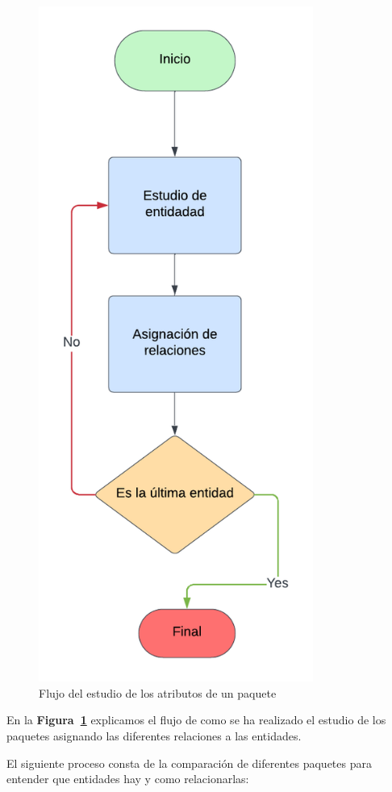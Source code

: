 \documentclass[a4paper, 12pt]{book}
\begin{document}
\begin{figure}
	\centering
	\includegraphics[width=9cm, keepaspectratio]{img/Estudio Atributos.png}
	\caption{Flujo del estudio de los atributos de un paquete}
	\label{fig:flujo_paquete}
\end{figure}

En la \textbf {Figura~\ref{fig:flujo_paquete}} explicamos el flujo de como se ha realizado el estudio de los paquetes asignando las diferentes relaciones a las entidades.

El siguiente proceso consta de la comparación de diferentes paquetes para entender que entidades hay y como relacionarlas:
\end{document}
